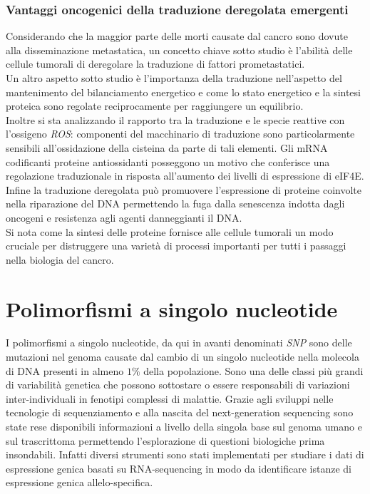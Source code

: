 		\subsubsection{Vantaggi oncogenici della traduzione deregolata emergenti}
		Considerando che la maggior parte delle morti causate dal cancro sono dovute alla disseminazione metastatica, un concetto chiave sotto studio \`e l'abilit\`a delle cellule tumorali di deregolare la traduzione di fattori prometastatici.\\
		Un altro aspetto sotto studio \`e l'importanza della traduzione nell'aspetto del mantenimento del bilanciamento energetico e come lo stato energetico e la sintesi proteica sono regolate reciprocamente per raggiungere un equilibrio.\\
		Inoltre si sta analizzando il rapporto tra la traduzione e le specie reattive con l'ossigeno \emph{ROS}: componenti del macchinario di traduzione sono particolarmente sensibili all'ossidazione della cisteina da parte di tali elementi.
		Gli mRNA codificanti proteine antiossidanti posseggono un motivo che conferisce una regolazione traduzionale in risposta all'aumento dei livelli di espressione di eIF4E.\\
		Infine la traduzione deregolata pu\`o promuovere l'espressione di proteine coinvolte nella riparazione del DNA permettendo la fuga dalla senescenza indotta dagli oncogeni e resistenza agli agenti danneggianti il DNA.\\
		Si nota come la sintesi delle proteine fornisce alle cellule tumorali un modo cruciale per distruggere una variet\`a di processi importanti per tutti i passaggi nella biologia del cancro.


\section{Polimorfismi a singolo nucleotide}
I polimorfismi a singolo nucleotide, da qui in avanti denominati \emph{SNP} sono delle mutazioni nel genoma causate dal cambio di un singolo nucleotide nella molecola di DNA presenti in almeno $1\%$ della popolazione.
Sono una delle classi pi\`u grandi di variabilit\`a genetica che possono sottostare o essere responsabili di variazioni inter-individuali in fenotipi complessi di malattie.
Grazie agli sviluppi nelle tecnologie di sequenziamento e alla nascita del next-generation sequencing sono state rese disponibili informazioni a livello della singola base sul genoma umano e sul trascrittoma permettendo l'esplorazione di questioni biologiche prima insondabili.
Infatti diversi strumenti sono stati implementati per studiare i dati di espressione genica basati su RNA-sequencing in modo da identificare istanze di espressione genica allelo-specifica.


